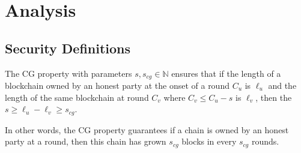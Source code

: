 \newcommand{\nweak}{\ensuremath{w}}
\newcommand{\weakperiod}{\ensuremath{\mathsf{\Gamma_\nweak}}}
\newcommand{\thweak}{\ensuremath{\tau_w}}
\newcommand{\numleak}{\ensuremath{\mathsf{leak}}}
\newcommand{\numanom}{\ensuremath{\mathtt{num\_anon}}}
\newcommand{\allvrfs}{\ensuremath{\mathtt{all\_vrfs}}}
\newcommand{\ub}{\ensuremath{\mathsf{ub}}}
\newcommand{\lb}{\ensuremath{\mathsf{lb}}}
\newcommand{\lbsumL}{\ensuremath{\underline{ \vrfwinninglist}^{\mathsf{sum}}}}
\newcommand{\ubL}{\ensuremath{\bar{\vrfwinninglist}}}
\newcommand{\eplen }{\ensuremath{R}}
\newcommand{\A }{\ensuremath{\mathcal{A}}}
\newcommand{\publicslots}{\ensuremath{\mathtt{public\_slots}}}
\newcommand{\phonestslots}{\ensuremath{\mathtt{p\_honest\_slots}}}
\newcommand{\honestslots}{\ensuremath{\mathtt{honest\_slots}}}
\newcommand{\malslots}{\ensuremath{\mathtt{mal\_slots}}}
\newcommand{\randweakslot}{\ensuremath{r\_weak\_slots}}
\newcommand{\publicvrfs}{\ensuremath{\mathtt{public\_vrfs}}}
\newcommand{\phonestvrfs}{\ensuremath{\mathtt{p\_honest\_vrfs}}}
\newcommand{\honestvrfs}{\ensuremath{\mathtt{honest\_vrfs}}}
\newcommand{\malvrfs}{\ensuremath{\mathtt{mal\_vrfs}}}
\newcommand{\malslotset}{\ensuremath{\mathcal{S}_m}}
\newcommand{\weakslotset}{\ensuremath{\mathcal{S}_w}}
\newcommand{\honestslotset}{\ensuremath{\mathcal{S}_h}}
\newcommand{\subslots}{\ensuremath{\mathbb{S}}}
\newcommand{\negl}{\ensuremath{\mathsf{negl}}}

\section{Analysis}

\subsection{Security Definitions}

\begin{definition} \label{def:cg}
	The CG  property with parameters $ s, s_{cg}\in \mathbb{N} $ ensures that if the length of a blockchain owned by an honest party at the onset of a round $ C_u $ is $ \ell_u $ and the length of the same blockchain at round $ C_v  $ where $ C_v \leq C_u - s  $ is $\ell_v$, then the $ s \geq \ell_u  - \ell_v \geq  s_{cg} $.
	
	
\end{definition}

In other words, the CG property guarantees if a chain is owned by an honest party at a round, then this chain has grown $ s_{cg}$ blocks in every $ s_{cg} $ rounds. 


